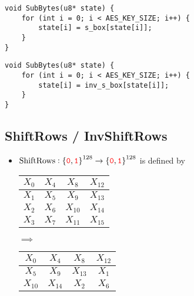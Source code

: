 \begin{lstlisting}[style=C, caption={Byte Substitution},captionpos=t]
void SubBytes(u8* state) {
	for (int i = 0; i < AES_KEY_SIZE; i++) {
		state[i] = s_box[state[i]];
	}
}
\end{lstlisting}

\begin{lstlisting}[style=C, caption={Inverse Byte Substitution},captionpos=t]
void SubBytes(u8* state) {
	for (int i = 0; i < AES_KEY_SIZE; i++) {
		state[i] = inv_s_box[state[i]];
	}
}
\end{lstlisting}

\newpage
\subsection{ShiftRows / InvShiftRows}
\begin{itemize}
	\item $\text{ShiftRows}:\set{\textcolor{red}{\texttt{0}},\textcolor{red}{\texttt{1}}}^{128}\to\set{\textcolor{red}{\texttt{0}},\textcolor{red}{\texttt{1}}}^{128}$ is defined by
	\begin{center}
	\begin{minipage}{.4\textwidth}\centering
		\begin{tabular}{|c|c|c|c|}
			\hline
			\cellcolor{red!20}$X_0$ & \cellcolor{red!20}$X_4$ & \cellcolor{red!20}$X_8$ & \cellcolor{red!20}$X_{12}$ \\ \hline
			\cellcolor{green!20}$X_1$ & \cellcolor{blue!20}$X_5$ & \cellcolor{blue!20}$X_9$ & \cellcolor{blue!20}$X_{13}$ \\ \hline
			\cellcolor{green!20}$X_2$ & \cellcolor{green!20}$X_6$ & \cellcolor{blue!20}$X_{10}$ & \cellcolor{blue!20}$X_{14}$ \\ \hline
			\cellcolor{green!20}$X_3$ & \cellcolor{green!20}$X_7$ & \cellcolor{green!20}$X_{11}$ & \cellcolor{blue!20}$X_{15}$ \\ \hline
		\end{tabular}
	\end{minipage}$\implies$\begin{minipage}{.4\textwidth}\centering
	\begin{tabular}{|c|c|c|c|}
		\hline
		\cellcolor{red!20}$X_0$ & \cellcolor{red!20}$X_4$ & \cellcolor{red!20}$X_8$ & \cellcolor{red!20}$X_{12}$ \\ \hline
		\cellcolor{blue!20}$X_5$ & \cellcolor{blue!20}$X_9$ & \cellcolor{blue!20}$X_{13}$ & \cellcolor{green!20}$X_1$ \\ \hline
		\cellcolor{blue!20}$X_{10}$ & \cellcolor{blue!20}$X_{14}$ & \cellcolor{green!20}$X_2$ & \cellcolor{green!20}$X_6$ \\ \hline

\end{tabular}
\end{minipage}
\end{center}
\end{itemize}
